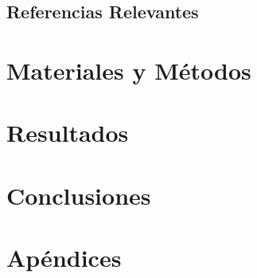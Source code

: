 \documentclass[12pt,titlepage,twoside,openright]{book}
\begin{document}
\section{Referencias Relevantes}

\chapter{Materiales y Métodos}
\label{cap:materialesymetodos}

\chapter{Resultados}
\label{cap:resultados}

\chapter{Conclusiones}
\label{cap:conclusiones}

\backmatter




\appendix
\chapter{Apéndices}
\label{ap:apendices}
\end{document}
